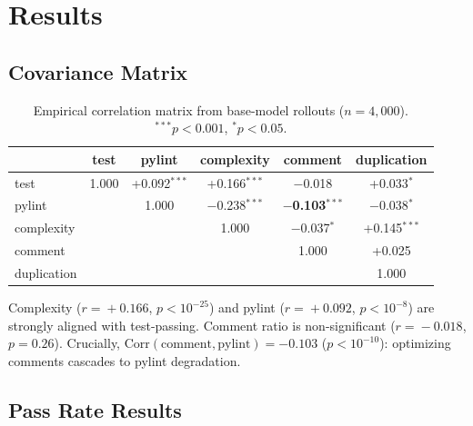 \documentclass{article}
\newcommand{\Corr}{\mathrm{Corr}}
\begin{document}
\section{Results}
\label{sec:results}

\subsection{Covariance Matrix}

\begin{table}[t]
\centering
\caption{Empirical correlation matrix from base-model rollouts ($n=4{,}000$). $^{***}p<0.001$, $^*p<0.05$.}
\label{tab:cov_matrix}
\begin{tabular}{lccccc}
\toprule
& test & pylint & complexity & comment & duplication \\
\midrule
test & 1.000 & +0.092$^{***}$ & +0.166$^{***}$ & $-$0.018 & +0.033$^*$ \\
pylint & & 1.000 & $-$0.238$^{***}$ & \textbf{$-$0.103}$^{***}$ & $-$0.038$^*$ \\
complexity & & & 1.000 & $-$0.037$^*$ & +0.145$^{***}$ \\
comment & & & & 1.000 & +0.025 \\
duplication & & & & & 1.000 \\
\bottomrule
\end{tabular}
\end{table}

Complexity ($r\!=\!+0.166$, $p\!<\!10^{-25}$) and pylint ($r\!=\!+0.092$, $p\!<\!10^{-8}$) are strongly aligned with test-passing. Comment ratio is non-significant ($r\!=\!-0.018$, $p\!=\!0.26$). Crucially, $\Corr(\text{comment}, \text{pylint}) = -0.103$ ($p\!<\!10^{-10}$): optimizing comments cascades to pylint degradation.

\subsection{Pass Rate Results}
\end{document}
